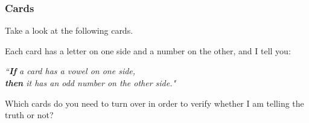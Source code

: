 \documentclass[14pt]{beamer}
\begin{document}
\begin{frame}
	\frametitle{Cards}

	Take a look at the following cards.

	\begin{center}
	\end{center}

	Each card has a letter on one side and a number on the other, and I tell you:

	\medskip
	\begin{block}{}
		\emph{``\textbf{If} a card has a vowel on one side, \\ \textbf{then} it has an
		odd number on the other side." }
	\end{block}

	\medskip
	Which cards do you need to turn over in order to verify whether I am telling the
	truth or not?
















\end{frame}
\end{document}
